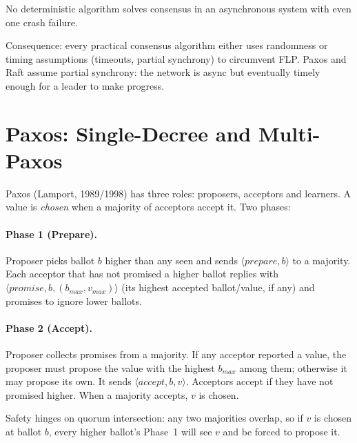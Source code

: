 \begin{theorem}
No deterministic algorithm solves consensus in an asynchronous system with even one crash failure.
\end{theorem}

Consequence: every practical consensus algorithm either uses randomness or timing assumptions (timeouts, partial synchrony) to circumvent FLP. Paxos and Raft assume partial synchrony: the network is async but eventually timely enough for a leader to make progress.

\section{Paxos: Single-Decree and Multi-Paxos}
\label{sec:paxos}
Paxos (Lamport, 1989/1998) has three roles: proposers, acceptors and learners. A value is \emph{chosen} when a majority of acceptors accept it. Two phases:

\paragraph{Phase 1 (Prepare).} Proposer picks ballot $b$ higher than any seen and sends $\langle prepare,b\rangle$ to a majority. Each acceptor that has not promised a higher ballot replies with $\langle promise,b, (b_{max},v_{max})\rangle$ (its highest accepted ballot/value, if any) and promises to ignore lower ballots.

\paragraph{Phase 2 (Accept).} Proposer collects promises from a majority. If any acceptor reported a value, the proposer must propose the value with the highest $b_{max}$ among them; otherwise it may propose its own. It sends $\langle accept,b,v\rangle$. Acceptors accept if they have not promised higher. When a majority accepts, $v$ is chosen.

Safety hinges on quorum intersection: any two majorities overlap, so if $v$ is chosen at ballot $b$, every higher ballot's Phase~1 will see $v$ and be forced to propose it.

